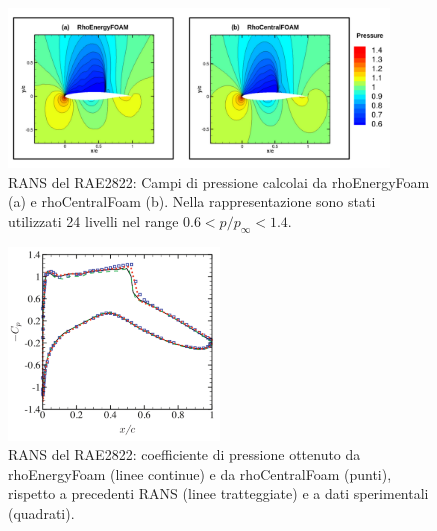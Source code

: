 \documentclass[a5paper]{sapthesis}
\begin{document}
	\begin{figure}[htp]
		\centering
		\includegraphics[width=0.9\textwidth]{Figures/RAE2822_pressurefield}
		\caption{RANS del RAE2822: Campi di pressione calcolai da rhoEnergyFoam (a) e rhoCentralFoam (b). Nella rappresentazione sono stati utilizzati 24 livelli nel range $0.6 < p/p_\infty < 1.4$.}
		\label{RAE2822_pressurefield}
	\end{figure}
	
	\begin{figure}[htp]
		\centering
		\includegraphics[width=0.5\textwidth]{Figures/Cp_RAE2822}
		\caption{RANS del RAE2822: coeﬃciente di pressione ottenuto da rhoEnergyFoam (linee continue) e da rhoCentralFoam (punti), rispetto a precedenti RANS (linee tratteggiate) e a dati sperimentali (quadrati).}
		\label{Cp_RAE2822}
	\end{figure}
\end{document}
